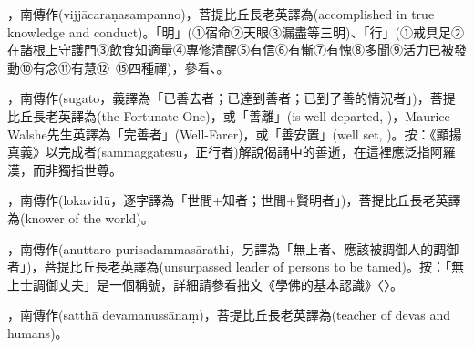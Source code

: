 \startitemgroup[noteitems]
\item{}，南傳作(vijjācaraṇasampanno)，菩提比丘長老英譯為(accomplished in true knowledge and conduct)。「明」(①宿命②天眼③漏盡等三明)、「行」(①戒具足②在諸根上守護門③飲食知適量④專修清醒⑤有信⑥有慚⑦有愧⑧多聞⑨活力已被發動⑩有念⑪有慧⑫~⑮四種禪)，參看、。
\stopitemgroup

\startitemgroup[noteitems]
\item{}，南傳作(sugato，義譯為「已善去者；已達到善者；已到了善的情況者」)，菩提比丘長老英譯為(the Fortunate One)，或「善離」(is well departed, )，Maurice Walshe先生英譯為「完善者」(Well-Farer)，或「善安置」(well set, )。按：《顯揚真義》以完成者(sammaggatesu，正行者)解說偈誦中的善逝，在這裡應泛指阿羅漢，而非獨指世尊。
\stopitemgroup

\startitemgroup[noteitems]
\item{}，南傳作(lokavidū，逐字譯為「世間+知者；世間+賢明者」)，菩提比丘長老英譯為(knower of the world)。
\stopitemgroup

\startitemgroup[noteitems]
\item{}，南傳作(anuttaro purisadammasārathi，另譯為「無上者、應該被調御人的調御者」)，菩提比丘長老英譯為(unsurpassed leader of persons to be tamed)。按：「無上士調御丈夫」是一個稱號，詳細請參看拙文《學佛的基本認識》〈〉。
\stopitemgroup

\startitemgroup[noteitems]
\item{}，南傳作(satthā devamanussānaṃ)，菩提比丘長老英譯為(teacher of devas and humans)。
\stopitemgroup

